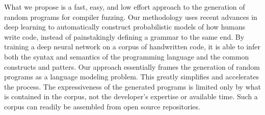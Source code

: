 

What we propose is a fast, easy, and low effort approach to the generation of random programs for compiler fuzzing. Our methodology uses recent advances in deep learning to automatically construct probabilistic models of how humans write code, instead of painstakingly defining a grammar to the same end. By training a deep neural network on a corpus of handwritten code, it is able to infer both the syntax and semantics of the programming language and the common constructs and patters. Our approach essentially frames the generation of random programs as a language modeling problem. This greatly simplifies and accelerates the process. The expressiveness of the generated programs is limited only by what is contained in the corpus, not the developer's expertise or available time. Such a corpus can readily be assembled from open source repositories.



